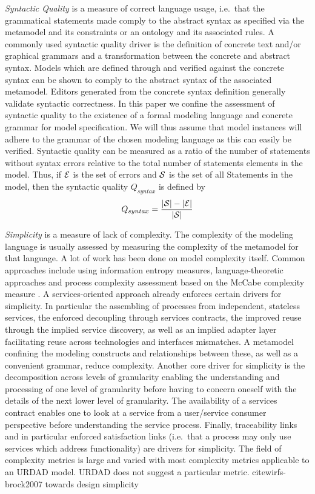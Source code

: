 \emph{Syntactic Quality} is a measure of correct language usage\cite{lange_christiaan_assessing_2007}, i.e.\ that the grammatical statements made comply to the abstract syntax as specified via the metamodel and its constraints or an ontology and its associated rules. A commonly used syntactic quality driver is the definition of concrete text and/or graphical grammars and a transformation between the concrete and abstract syntax. Models which are defined through and verified against the concrete syntax can be shown to comply to the abstract syntax of the associated metamodel. Editors generated from the concrete syntax definition generally validate syntactic correctness. In this paper we confine the assessment of syntactic quality to the existence of a formal modeling language and concrete grammar for model specification. We will thus assume that model instances will adhere to the grammar of the chosen modeling language as this can easily be verified. Syntactic quality can be measured as a ratio of the number of statements without syntax errors relative to the total number of statements elements in the model. Thus, if $\cal{E}$ is the set of errors and $\cal{S}$ is the set of all Statements in the model, then the syntactic quality $Q_{syntax}$ is defined by
\begin{equation}
  Q_{syntax} = \frac{|\cal{S}| - |\cal{E}|}{|\cal{S}|}
\end{equation}

\emph{Simplicity} is a measure of lack of complexity. The complexity of the modeling language is usually assessed by measuring the complexity of the metamodel for that language\cite{mohagheghi_evaluating_2007}. A lot of work has been done on model complexity itself. Common approaches include using information entropy measures\cite{abrahamsson_extreme_2004}, language-theoretic approaches\cite{podgorelec_estimating_2007} and process complexity assessment based on the McCabe complexity measure \cite{mccabe_complexity_1976}. A services-oriented approach already enforces certain drivers for simplicity. In particular the assembling of processes from independent, stateless services, the enforced decoupling through services contracts, the improved reuse through the implied service discovery, as well as an implied adapter layer facilitating reuse across technologies and interfaces mismatches. A metamodel confining the modeling constructs and relationships between these, as well as a convenient grammar, reduce complexity. Another core driver for simplicity is the decomposition across levels of granularity enabling the understanding and processing of one level of granularity before having to concern oneself with the details of the next lower level of granularity. The availability of a services contract enables one to look at a service from a user/service consumer perspective before understanding the service process. Finally, traceability links and in particular enforced satisfaction links (i.e.\ that a process may only use services which address functionality) are drivers for simplicity. The field of complexity metrics is large and varied with most complexity metrics applicable to an URDAD model. URDAD does not suggest a particular metric. cite{wirfs-brock2007 towards design simplicity}


